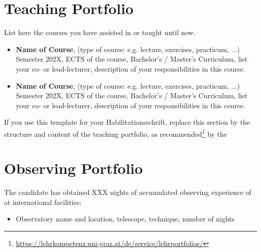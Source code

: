 \section*{Teaching Portfolio}%
List here the courses you have assisted in or taught until now.
\begin{itemize}
    
    \item \textbf{Name of Course}, 
    (type of course: e.g. lecture, exercises, practicum, ...) 
    Semester 202X, 
    ECTS of the course, 
    Bachelor's / Master's Curriculum,
    list your co- or lead-lecturer, 
    description of your responsibilities in this course.

    \item \textbf{Name of Course}, 
    (type of course: e.g. lecture, exercises, practicum, ...) 
    Semester 202X, 
    ECTS of the course, 
    Bachelor's / Master's Curriculum,
    list your co- or lead-lecturer, 
    description of your responsibilities in this course.

\end{itemize}

 If you use this template for your Habilitationsschrift, replace this section by the structure and content of the teaching portfolio, as recommended\footnote{\href{https://lehrkompetenz.uni-graz.at/de/service/lehrportfolios/}{https://lehrkompetenz.uni-graz.at/de/service/lehrportfolios/}} by the 


\section*{Observing Portfolio}%

The candidate has obtained XXX nights of accumulated observing experience of at international facilities:
\begin{itemize}
    \item Observatory name and location, telescope, technique, number of nights
\end{itemize}



